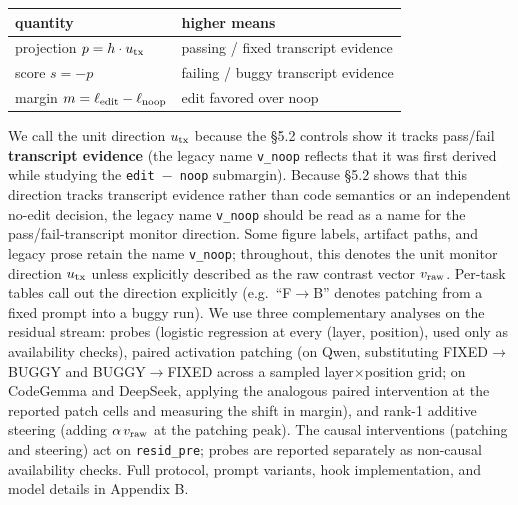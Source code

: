\documentclass[
  11pt,
  a4paper]{article}
\newcounter{none} %
\begin{document}
{\def\LTcaptype{none} %
\begin{longtable}[]{@{}
  >{\raggedright\arraybackslash}p{}
  >{\raggedright\arraybackslash}p{}@{}}
\toprule\noalign{}
\begin{minipage}[b]{\linewidth}\raggedright
quantity
\end{minipage} & \begin{minipage}[b]{\linewidth}\raggedright
higher means
\end{minipage} \\
\midrule\noalign{}
\endhead
\bottomrule\noalign{}
\endlastfoot
projection \(p = h\cdot u_{\rm tx}\) & passing / fixed transcript
evidence \\
score \(s = -p\) & failing / buggy transcript evidence \\
margin \(m = \ell_{\rm edit}-\ell_{\rm noop}\) & edit favored over
noop \\
\end{longtable}
}

We call the unit direction \(u_{\rm tx}\) because the \S{}5.2 controls show
it tracks pass/fail \textbf{transcript evidence} (the legacy name
\texttt{v\_noop} reflects that it was first derived while studying the
\texttt{edit\ \ensuremath{-}\ noop} submargin). Because \S{}5.2 shows that this
direction tracks transcript evidence rather than code semantics or an
independent no-edit decision, the legacy name \texttt{v\_noop} should be
read as a name for the pass/fail-transcript monitor direction. Some
figure labels, artifact paths, and legacy prose retain the name
\texttt{v\_noop}; throughout, this denotes the unit monitor direction
\(u_{\rm tx}\) unless explicitly described as the raw contrast vector
\(v_{\rm raw}\). Per-task tables call out the direction explicitly
(e.g.~``F\ensuremath{\rightarrow}B'' denotes patching from a fixed prompt into a buggy run). We
use three complementary analyses on the residual stream: probes
(logistic regression at every (layer, position), used only as
availability checks), paired activation patching (on Qwen, substituting
FIXED\ensuremath{\rightarrow}BUGGY and BUGGY\ensuremath{\rightarrow}FIXED across a sampled layer\ensuremath{\times}position grid; on
CodeGemma and DeepSeek, applying the analogous paired intervention at
the reported patch cells and measuring the shift in margin), and rank-1
additive steering (adding \(\alpha\,v_{\rm raw}\) at the patching peak).
The causal interventions (patching and steering) act on
\texttt{resid\_pre}; probes are reported separately as non-causal
availability checks. Full protocol, prompt variants, hook
implementation, and model details in Appendix B.
\end{document}
